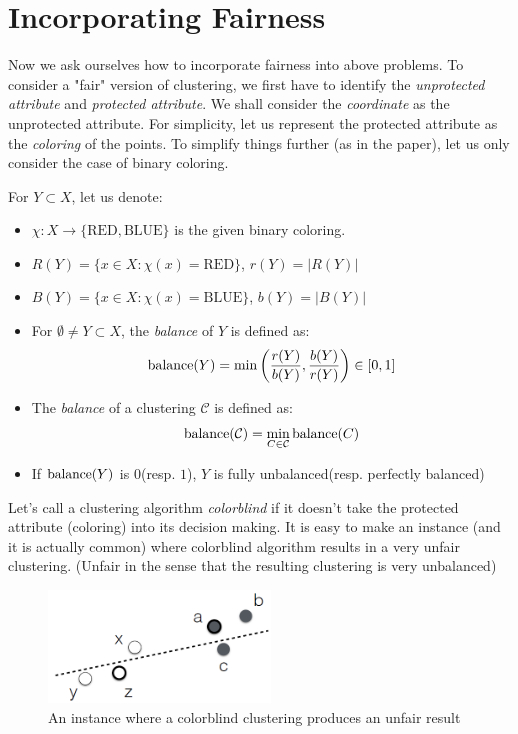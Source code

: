\section{Incorporating Fairness}

Now we ask ourselves how to incorporate fairness into above problems.
To consider a "fair" version of clustering, we first have to identify the {\it unprotected attribute} and {\it protected attribute}.
We shall consider the {\it coordinate} as the unprotected attribute. For simplicity, let us represent the protected attribute as the {\it coloring} of the points.
To simplify things further (as in the paper), let us only consider the case of binary coloring.


For $Y \subset X$, let us denote:
\begin{itemize}
	\item $\chi : X \rightarrow \{\text{RED}, \text{BLUE}\}$ is the given binary coloring.
	\item $R(Y) = \{x \in X : \chi(x) = \text{RED}\}$, $r(Y) = |R(Y)|$
	\item $B(Y) = \{x \in X : \chi(x) = \text{BLUE}\}$, $b(Y) = |B(Y)|$
\end{itemize}

\begin{definition}
\begin{itemize}
\item For $\emptyset \not= Y \subset X$, the {\it balance} of $Y$ is defined as:
$$\operatorname{balance}(Y) = \min \left( \frac{r(Y)}{b(Y)}, \frac{b(Y)}{r(Y)} \right) \in [0, 1]$$

\item The {\it balance} of a clustering $\mathcal{C}$ is defined as:
$$\operatorname{balance}(\mathcal{C}) = \min_{C \in \mathcal{C}} \operatorname{balance}(C)$$

\item If $\operatorname{balance}(Y)$ is $0$(resp. $1$), $Y$ is fully unbalanced(resp. perfectly balanced)
\end{itemize}
\end{definition}

Let's call a clustering algorithm {\it colorblind} if it doesn't take the protected attribute (coloring) into its decision making. It is easy to make an instance (and it is actually common) where colorblind algorithm results in a very unfair clustering. (Unfair in the sense that the resulting clustering is very unbalanced)
\begin{figure}[hbt!]
	\centering
	\includegraphics[height=3cm]{preliminaries/fig/fig1.png}
	\caption{An instance where a colorblind clustering produces an unfair result}
\end{figure}

